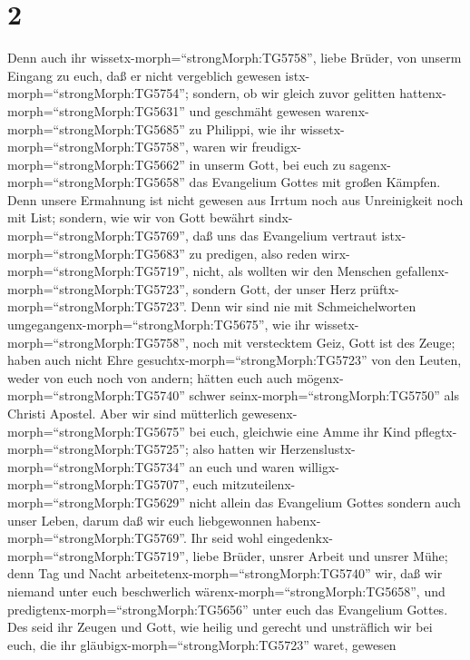\hypertarget{section-1}{%
\section{2}\label{section-1}}

 Denn auch ihr wissetx-morph=``strongMorph:TG5758'', liebe
Brüder, von unserm Eingang zu euch, daß er nicht vergeblich gewesen
istx-morph=``strongMorph:TG5754'';  sondern, ob wir gleich
zuvor gelitten hattenx-morph=``strongMorph:TG5631'' und geschmäht
gewesen warenx-morph=``strongMorph:TG5685'' zu Philippi, wie ihr
wissetx-morph=``strongMorph:TG5758'', waren wir
freudigx-morph=``strongMorph:TG5662'' in unserm Gott, bei euch zu
sagenx-morph=``strongMorph:TG5658'' das Evangelium Gottes mit großen
Kämpfen.  Denn unsere Ermahnung ist nicht gewesen aus Irrtum
noch aus Unreinigkeit noch mit List;  sondern, wie wir von
Gott bewährt sindx-morph=``strongMorph:TG5769'', daß uns das Evangelium
vertraut istx-morph=``strongMorph:TG5683'' zu predigen, also reden
wirx-morph=``strongMorph:TG5719'', nicht, als wollten wir den Menschen
gefallenx-morph=``strongMorph:TG5723'', sondern Gott, der unser Herz
prüftx-morph=``strongMorph:TG5723''.  Denn wir sind nie mit
Schmeichelworten umgegangenx-morph=``strongMorph:TG5675'', wie ihr
wissetx-morph=``strongMorph:TG5758'', noch mit verstecktem Geiz, Gott
ist des Zeuge;  haben auch nicht Ehre
gesuchtx-morph=``strongMorph:TG5723'' von den Leuten, weder von euch
noch von andern;  hätten euch auch
mögenx-morph=``strongMorph:TG5740'' schwer
seinx-morph=``strongMorph:TG5750'' als Christi Apostel. Aber wir sind
mütterlich gewesenx-morph=``strongMorph:TG5675'' bei euch, gleichwie
eine Amme ihr Kind pflegtx-morph=``strongMorph:TG5725''; 
also hatten wir Herzenslustx-morph=``strongMorph:TG5734'' an euch und
waren willigx-morph=``strongMorph:TG5707'', euch
mitzuteilenx-morph=``strongMorph:TG5629'' nicht allein das Evangelium
Gottes sondern auch unser Leben, darum daß wir euch liebgewonnen
habenx-morph=``strongMorph:TG5769''.  Ihr seid wohl
eingedenkx-morph=``strongMorph:TG5719'', liebe Brüder, unsrer Arbeit und
unsrer Mühe; denn Tag und Nacht arbeitetenx-morph=``strongMorph:TG5740''
wir, daß wir niemand unter euch beschwerlich
wärenx-morph=``strongMorph:TG5658'', und
predigtenx-morph=``strongMorph:TG5656'' unter euch das Evangelium
Gottes.  Des seid ihr Zeugen und Gott, wie heilig und
gerecht und unsträflich wir bei euch, die ihr
gläubigx-morph=``strongMorph:TG5723'' waret, gewesen
